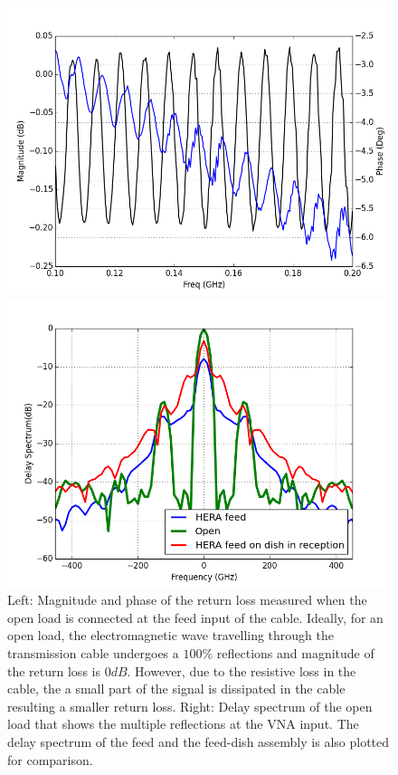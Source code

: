 \documentclass[twocolumn]{emulateapj}
\begin{document}
\begin{figure}[ht]
\begin{minipage}[b]{0.5\linewidth}
\centering
\includegraphics[angle=0, width=\linewidth]{plots/open_RL.png}
\end{minipage}
\hspace{0.1cm}
\begin{minipage}[b]{0.5\linewidth}
\centering
\includegraphics[angle=0, width=\linewidth]{plots/open_delay.png}
\end{minipage}
\caption{Left: Magnitude and phase of the return loss measured when the open load is connected at the feed input of the cable. Ideally, for an open load, the electromagnetic wave travelling through the transmission cable undergoes a $100\%$ reflections and magnitude of the return loss is $0dB$. However, due to the resistive loss in the cable, the a small part of the signal is dissipated in the cable resulting a smaller return loss.  Right: Delay spectrum of the open load that shows the multiple reflections at the VNA input. The delay spectrum of the feed and the feed-dish assembly is also plotted for comparison.}
\label{fig:open_RL}       
\end{figure}
\end{document}
